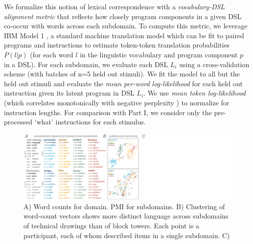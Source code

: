 \documentclass[10pt,letterpaper]{article}
\begin{document}
We formalize this notion of lexical correspondence with a \textit{vocabulary-DSL alignment metric} that reflects how closely program components in a given DSL co-occur with words across each subdomain. To compute this metric, we leverage IBM Model 1 , a standard machine translation model which can be fit to paired programs and instructions to estimate token-token translation probabilities $P(l|p)$ (for each word $l$ in the linguistic vocabulary and program component $p$ in a DSL). For each subdomain, we evaluate each DSL $L_i$ using a cross-validation scheme (with batches of n=5 held out stimuli). We fit the model to all but the held out stimuli and evaluate the \textit{mean per-word log-likelihood} for each held out instruction given its latent program in DSL $L_i$. We use \textit{mean token log-likelihood} (which correlates monotonically with negative {perplexity} ) to normalize for instruction lengths. For comparison with Part I, we consider only the pre-processed `what' instructions for each stimulus.

\begin{figure}[!ht]
  \begin{center}
  \includegraphics[width=1.0\linewidth]{figures/lax_vocabularies.pdf}
  \caption{A) Word counts for domain. PMI for subdomains. B) Clustering of word-count vectors shows more distinct language across subdomains of technical drawings than of block towers. Each point is a participant, each of whom described items in a single subdomain. C) }
  \label{fig:vocabulary_gallery}
  \end{center}
\end{figure}
\end{document}
